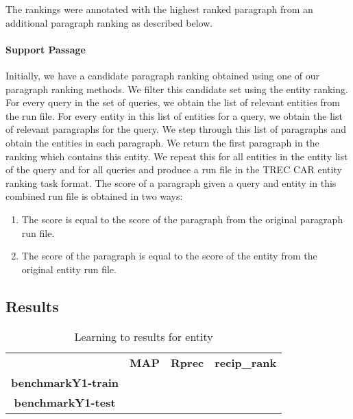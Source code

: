 \documentclass{article}
\begin{document}
The rankings were annotated with the highest ranked paragraph from an additional paragraph ranking as described below.
\paragraph{Support Passage} Initially, we have a candidate paragraph ranking obtained using one of our paragraph ranking methods. We filter this candidate set using the entity ranking. For every query in the set of queries, we obtain the list of relevant entities from the run file. For every entity in this list of entities for a query, we obtain the list of relevant paragraphs for the query. We step through this list of paragraphs and obtain the entities in each paragraph. We return the first paragraph in the ranking which contains this entity. We  repeat this for all entities in the entity list of the query and for all queries and produce a run file in the TREC CAR entity ranking task format. The score of a paragraph given a query and entity in this combined run file is obtained in two ways:
\begin{enumerate}
\item The score is equal to the score of the paragraph from the original paragraph run file. 
\item The score of the paragraph is equal to the score of the entity from the original entity run file. 
\end{enumerate}

\subsection{Results}

\begin{table}[H]
\centering
\begin{tabular}{clll}
\multicolumn{1}{l}{}       & \multicolumn{1}{c}{\textbf{MAP}} & \multicolumn{1}{c}{\textbf{Rprec}} & \multicolumn{1}{c}{\textbf{recip\_rank}} \\
\textbf{benchmarkY1-train} &                                  &                                    &                                          \\
\textbf{benchmarkY1-test}  &                                  &                                    &                                         
\end{tabular}
\caption{Learning to results for entity}
\end{table}
\end{document}
